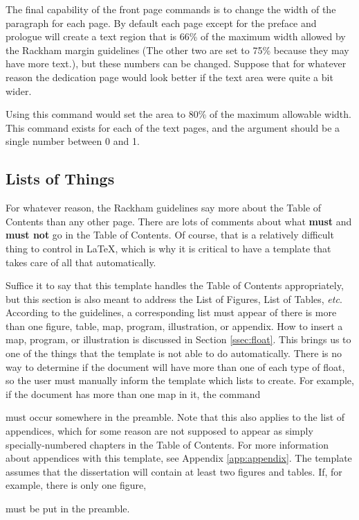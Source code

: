\documentclass[thesis]{./tex/thesis-umich}
\begin{document}
The final capability of the front page commands is to change the width
of the paragraph for each page.  By default each page except for the
preface and prologue will create a text region that is 66\% of the
maximum width allowed by the Rackham margin guidelines (The other two
are set to 75\% because they may have more text.), but these numbers
can be changed.  Suppose that for whatever reason the dedication page
would look better if the text area were quite a bit wider.
\begin{code}
\end{code}
Using this command would set the area to 80\% of the maximum allowable
width.  This command exists for each of the text pages, and the argument
should be a single number between 0 and 1.


\subsection{Lists of Things}   \label{ssec:lists}
For whatever reason, the Rackham guidelines say more about the Table of
Contents than any other page.  There are lots of comments about what
\textbf{\textsf{must}} and \textbf{\textsf{must not}} go in the Table
of Contents.  Of course, that is a relatively difficult thing to control
in \LaTeX, which is why it is critical to have a template that takes
care of all that automatically.

Suffice it to say that this template handles the Table of Contents
appropriately, but this section is also meant to address the List of
Figures, List of Tables, \textit{etc}.  According to the guidelines,
a corresponding list must appear of there is more than one figure,
table, map, program, illustration, or appendix.  How to insert a map,
program, or illustration is discussed in Section \ref{ssec:float}.  This
brings us to one of the things that the template is not able to do
automatically.  There is no way to determine if the document will have
more than one of each type of float, so the user must manually inform
the template which lists to create.  For example, if the document has
more than one map in it, the command
\begin{code}
\showlistofmaps
\end{code}
must occur somewhere in the preamble.  Note that this also applies to
the list of appendices, which for some reason are not supposed to
appear as simply specially-numbered chapters in the Table of Contents.
For more information about appendices with this template, see Appendix
\ref{app:appendix}.  The template assumes that the dissertation will
contain at least two figures and tables.  If, for example, there is only
one figure,
\begin{code}
\hidelistoffigures
\end{code}
must be put in the preamble.
\end{document}
